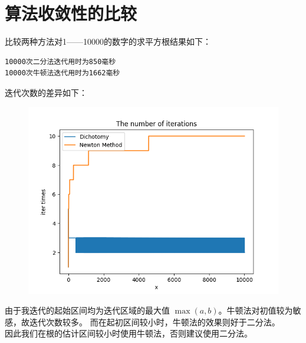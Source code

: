 \documentclass{ctexart}
\begin{document}
    \section{算法收敛性的比较}\label{S4}
    比较两种方法对1——10000的数字的求平方根结果如下：
    \begin{lstlisting}
10000次二分法迭代用时为850毫秒
10000次牛顿法迭代用时为1662毫秒
    \end{lstlisting}
    迭代次数的差异如下：
    \begin{figure}[H]
        \centering
        \includegraphics{./src/item}
    \end{figure}
    由于我迭代的起始区间均为迭代区域的最大值 $\max(a,b)$。牛顿法对初值较为敏感，故迭代次数较多。
    而在起初区间较小时，牛顿法的效果则好于二分法。\\
    因此我们在根的估计区间较小时使用牛顿法，否则建议使用二分法。
    
\end{document}

